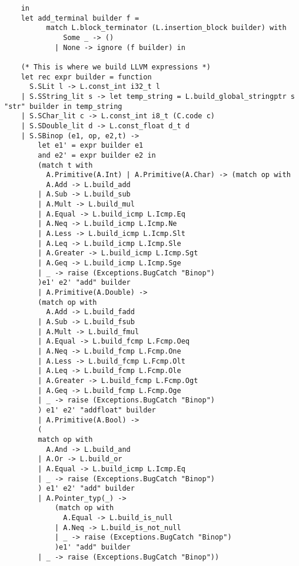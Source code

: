 \documentclass{article}
\begin{document}
\begin{lstlisting}
	in 
	let add_terminal builder f =
          match L.block_terminator (L.insertion_block builder) with
        	  Some _ -> ()
      		| None -> ignore (f builder) in	

	(* This is where we build LLVM expressions *)
	let rec expr builder = function 
	  S.SLit l -> L.const_int i32_t l
	| S.SString_lit s -> let temp_string = L.build_global_stringptr s "str" builder in temp_string 
	| S.SChar_lit c -> L.const_int i8_t (C.code c)
	| S.SDouble_lit d -> L.const_float d_t d
	| S.SBinop (e1, op, e2,t) -> 
		let e1' = expr builder e1 
		and e2' = expr builder e2 in
		(match t with 
		  A.Primitive(A.Int) | A.Primitive(A.Char) -> (match op with 
		  A.Add -> L.build_add 
		| A.Sub -> L.build_sub
		| A.Mult -> L.build_mul
		| A.Equal -> L.build_icmp L.Icmp.Eq
		| A.Neq -> L.build_icmp L.Icmp.Ne
		| A.Less -> L.build_icmp L.Icmp.Slt
		| A.Leq -> L.build_icmp L.Icmp.Sle
		| A.Greater -> L.build_icmp L.Icmp.Sgt
		| A.Geq -> L.build_icmp L.Icmp.Sge
		| _ -> raise (Exceptions.BugCatch "Binop")		
		)e1' e2' "add" builder
		| A.Primitive(A.Double) ->
		(match op with 
		  A.Add -> L.build_fadd 
		| A.Sub -> L.build_fsub
		| A.Mult -> L.build_fmul
		| A.Equal -> L.build_fcmp L.Fcmp.Oeq
		| A.Neq -> L.build_fcmp L.Fcmp.One
		| A.Less -> L.build_fcmp L.Fcmp.Olt
		| A.Leq -> L.build_fcmp L.Fcmp.Ole
		| A.Greater -> L.build_fcmp L.Fcmp.Ogt
		| A.Geq -> L.build_fcmp L.Fcmp.Oge
		| _ -> raise (Exceptions.BugCatch "Binop")
		) e1' e2' "addfloat" builder
		| A.Primitive(A.Bool) -> 
		(
		match op with 
		  A.And -> L.build_and
		| A.Or -> L.build_or
		| A.Equal -> L.build_icmp L.Icmp.Eq
		| _ -> raise (Exceptions.BugCatch "Binop")
		) e1' e2' "add" builder	
		| A.Pointer_typ(_) ->
			(match op with
			  A.Equal -> L.build_is_null
			| A.Neq -> L.build_is_not_null
			| _ -> raise (Exceptions.BugCatch "Binop")
			)e1' "add" builder
		| _ -> raise (Exceptions.BugCatch "Binop")) 		 


\end{lstlisting}
\end{document}

